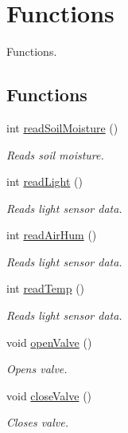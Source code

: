 \hypertarget{group__fn}{}\section{Functions}
\label{group__fn}


Functions.  


\subsection*{Functions}
\begin{DoxyCompactItemize}
\item 
int \hyperlink{group__fn_gad9f70a6b7041c4076dedeee90f6d8310}{read\+Soil\+Moisture} ()
\begin{DoxyCompactList}\small\item\em Reads soil moisture. \end{DoxyCompactList}\item 
int \hyperlink{group__fn_gaf1d63455e5a91999225f25fd0cebc18e}{read\+Light} ()
\begin{DoxyCompactList}\small\item\em Reads light sensor data. \end{DoxyCompactList}\item 
int \hyperlink{group__fn_ga3f52b419973bff123775a1563e885dd5}{read\+Air\+Hum} ()
\begin{DoxyCompactList}\small\item\em Reads light sensor data. \end{DoxyCompactList}\item 
int \hyperlink{group__fn_ga74a34c8130ac7351dc0b1e449064e012}{read\+Temp} ()
\begin{DoxyCompactList}\small\item\em Reads light sensor data. \end{DoxyCompactList}\item 
void \hyperlink{group__fn_gaaa5719f3ed552267c274e0d67ba68eb0}{open\+Valve} ()
\begin{DoxyCompactList}\small\item\em Opens valve. \end{DoxyCompactList}\item 
void \hyperlink{group__fn_ga997df9668870770cd913acabd010f672}{close\+Valve} ()
\begin{DoxyCompactList}\small\item\em Closes valve. \end{DoxyCompactList}\item 

\end{DoxyCompactItemize}

